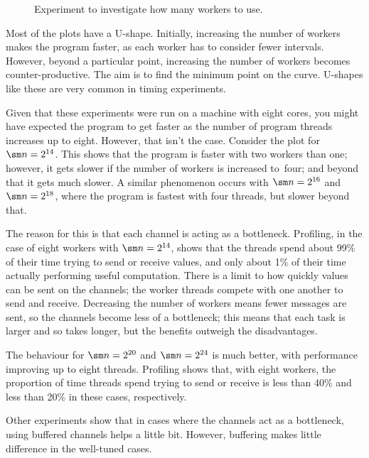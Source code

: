 
\begin{figure}
\begin{center}

\end{center}
\caption{Experiment to investigate how many workers to use.}
\label{fig:trapeziumExperimentLogScale}
\end{figure}


Most of the plots have a U-shape.  Initially, increasing the number of workers
makes the program faster, as each worker has to consider fewer intervals.
However, beyond a particular point, increasing the number of workers becomes
counter-productive.  The aim is to find the minimum point on the curve.
U-shapes like these are very common in timing experiments.

Given that these experiments were run on a machine with eight cores, you might
have expected the program to get faster as the number of program threads
increases up to eight.  However, that isn't the case.  Consider the plot for
$\sm n = 2^{14}$.  This shows that the program is faster with two workers than
one; however, it gets slower if the number of workers is increased to~four;
and beyond that it gets much slower.  A similar phenomenon occurs with $\sm n
= 2^{16}$ and $\sm n = 2^{18}$, where the program is fastest with four
threads, but slower beyond that.  

The reason for this is that each channel is acting as a bottleneck.
Profiling, in the case of eight workers with $\sm n = 2^{14}$, shows that the
threads spend about 99\% of their time trying to send or receive values, and
only about 1\% of their time actually performing useful computation.  There is
a limit to how quickly values can be sent on the channels; the worker threads
compete with one another to send and receive.  Decreasing the number of
workers means fewer messages are sent, so the channels become less of a
bottleneck; this means that each task is larger and so takes longer, but the
benefits outweigh the disadvantages.  

The behaviour for $\sm n = 2^{20}$ and $\sm n = 2^{24}$ is much better, with
performance improving up to eight threads.  Profiling shows that, with eight
workers, the proportion of time threads spend trying to send or receive
is less than 40\% and less than 20\% in these cases, respectively.


Other experiments show that in cases where the channels act as a bottleneck, 
using buffered channels helps a little bit.  However, buffering makes little
difference in the well-tuned cases.
 
